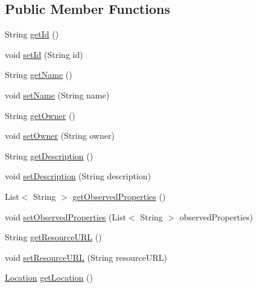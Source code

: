 \subsection*{Public Member Functions}
\begin{DoxyCompactItemize}
\item 
String \hyperlink{classeu_1_1h2020_1_1symbiote_1_1model_1_1Resource_a6d2b00f0e94b55cce1daff002012369c}{get\+Id} ()
\item 
void \hyperlink{classeu_1_1h2020_1_1symbiote_1_1model_1_1Resource_a209815ba7cdb6b82334e664eb4c38708}{set\+Id} (String id)
\item 
String \hyperlink{classeu_1_1h2020_1_1symbiote_1_1model_1_1Resource_a7332986d4dfa4ca233f705659f166f2c}{get\+Name} ()
\item 
void \hyperlink{classeu_1_1h2020_1_1symbiote_1_1model_1_1Resource_ad2cd06bcbfa928adead9017509cc2e78}{set\+Name} (String name)
\item 
String \hyperlink{classeu_1_1h2020_1_1symbiote_1_1model_1_1Resource_a0bd495e4c9a10fac6e885de268b5ad76}{get\+Owner} ()
\item 
void \hyperlink{classeu_1_1h2020_1_1symbiote_1_1model_1_1Resource_a4391365a9ef765fb9c96e8243a45fafb}{set\+Owner} (String owner)
\item 
String \hyperlink{classeu_1_1h2020_1_1symbiote_1_1model_1_1Resource_ae2ce583e094c18bca236027602739049}{get\+Description} ()
\item 
void \hyperlink{classeu_1_1h2020_1_1symbiote_1_1model_1_1Resource_a19349909b51f43be943fcc3ebc078009}{set\+Description} (String description)
\item 
List$<$ String $>$ \hyperlink{classeu_1_1h2020_1_1symbiote_1_1model_1_1Resource_a2aaf59e1be5b0c974a31e106adfa6c43}{get\+Observed\+Properties} ()
\item 
void \hyperlink{classeu_1_1h2020_1_1symbiote_1_1model_1_1Resource_a826dbee60cf539ffbf1a088496ac7e11}{set\+Observed\+Properties} (List$<$ String $>$ observed\+Properties)
\item 
String \hyperlink{classeu_1_1h2020_1_1symbiote_1_1model_1_1Resource_a4a0c05d9007f2216c55ddc32a44f467b}{get\+Resource\+U\+RL} ()
\item 
void \hyperlink{classeu_1_1h2020_1_1symbiote_1_1model_1_1Resource_a27d7401a8087bf902fd575039d574d0c}{set\+Resource\+U\+RL} (String resource\+U\+RL)
\item 
\hyperlink{classeu_1_1h2020_1_1symbiote_1_1model_1_1Location}{Location} \hyperlink{classeu_1_1h2020_1_1symbiote_1_1model_1_1Resource_acfb7ead093f1ed692640c99daba8fc6c}{get\+Location} ()

\end{DoxyCompactItemize}
